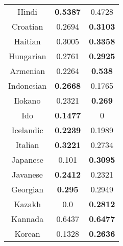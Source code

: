 \begin{figure}[h]
\begin{tabular}{ccc}
Hindi&\textbf{0.5387}&0.4728\\
Croatian&0.2694&\textbf{0.3103}\\
Haitian&0.3005&\textbf{0.3358}\\
Hungarian&0.2761&\textbf{0.2925}\\
Armenian&0.2264&\textbf{0.538}\\
Indonesian&\textbf{0.2668}&0.1765\\
Ilokano&0.2321&\textbf{0.269}\\
Ido&\textbf{0.1477}&0\\
Icelandic&\textbf{0.2239}&0.1989\\
Italian&\textbf{0.3221}&0.2734\\
Japanese&0.101&\textbf{0.3095}\\
Javanese&\textbf{0.2412}&0.2321\\
Georgian&\textbf{0.295}&0.2949\\
Kazakh&0.0&\textbf{0.2812}\\
Kannada&0.6437&\textbf{0.6477}\\
Korean&0.1328&\textbf{0.2636}\\
\end{tabular}
\end{figure}
